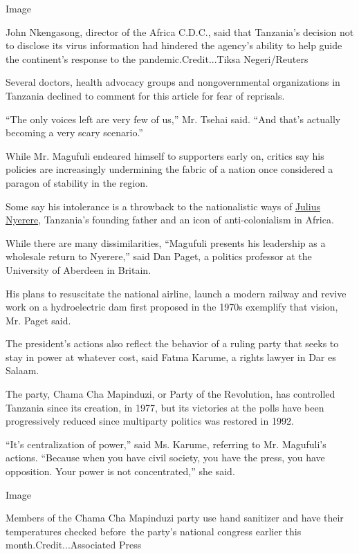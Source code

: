 Image

John Nkengasong, director of the Africa C.D.C., said that Tanzania's
decision not to disclose its virus information had hindered the agency's
ability to help guide the continent's response to the
pandemic.Credit...Tiksa Negeri/Reuters

Several doctors, health advocacy groups and nongovernmental
organizations in Tanzania declined to comment for this article for fear
of reprisals.

``The only voices left are very few of us,'' Mr. Tsehai said. ``And
that's actually becoming a very scary scenario.''

While Mr. Magufuli endeared himself to supporters early on, critics say
his policies are increasingly undermining the fabric of a nation once
considered a paragon of stability in the region.

Some say his intolerance is a throwback to the nationalistic ways of
\href{https://www.nytimes.com/1999/10/15/world/julius-nyerere-of-tanzania-dies-preached-african-socialism-to-the-world.html}{Julius
Nyerere}, Tanzania's founding father and an icon of anti-colonialism in
Africa.

While there are many dissimilarities, ``Magufuli presents his leadership
as a wholesale return to Nyerere,'' said Dan Paget, a politics professor
at the University of Aberdeen in Britain.

His plans to resuscitate the national airline, launch a modern railway
and revive work on a hydroelectric dam first proposed in the 1970s
exemplify that vision, Mr. Paget said.

The president's actions also reflect the behavior of a ruling party that
seeks to stay in power at whatever cost, said Fatma Karume, a rights
lawyer in Dar es Salaam.

The party, Chama Cha Mapinduzi, or Party of the Revolution, has
controlled Tanzania since its creation, in 1977, but its victories at
the polls have been progressively reduced since multiparty politics was
restored in 1992.

``It's centralization of power,'' said Ms. Karume, referring to Mr.
Magufuli's actions. ``Because when you have civil society, you have the
press, you have opposition. Your power is not concentrated,'' she said.

Image

Members of the Chama Cha Mapinduzi party use hand sanitizer and have
their temperatures checked before~the party's national congress earlier
this month.Credit...Associated Press

